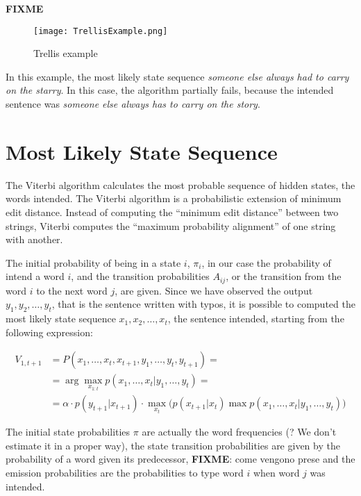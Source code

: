 \textbf{FIXME}
\begin{figure}[H]
	\centering
	\texttt{[image: TrellisExample.png]}
	\caption{Trellis example}
	\label{fig:trellis}
\end{figure}

In this example, the most likely state sequence \textsl{someone else always had to carry on the starry}. In this 
case, the algorithm partially fails, because the intended sentence was \textsl{someone else always has to carry 
	on the story}.


\section{Most Likely State Sequence}

The Viterbi algorithm calculates the most probable sequence of hidden states, the words intended.
The Viterbi algorithm is a probabilistic extension of minimum edit distance. Instead of computing the “minimum 
edit distance” between two strings, Viterbi computes the “maximum probability alignment” of one string with 
another. 

The initial probability of being in a state $i$, $\pi_i$, in our case the probability of intend a word $i$, and the 
transition probabilities $A_{ij}$, or the transition from the word $i$ to the next word $j$, are given. Since we have 
observed the output $y_1, y_2, \dots , y_t$, that is the sentence written with typos, it is possible to computed the most 
likely state sequence $x_1, x_2, \dots , x_t$, the sentence intended, starting from the following expression:

\begin{equation}
\begin{aligned}
V_{1,t+1} &= P(x_1, \dots, x_t, x_{t+1}, y_1, \dots, y_t,  y_{t+1}) = \\
&= \arg\max_{x_{1:t}} p(x_1, \dots, x_t | y_1, \dots, y_t) = \\
& =  \alpha \cdot p(y_{t+1}|x_{t+1})\cdot\max_{x_t} \Big( p(x_{t+1}|x_t) \max p(x_1, \dots, x_{t}|y_1, 
\dots, y_t)\Big)
\end{aligned}
\end{equation}

The initial state probabilities $\pi$ are actually the word frequencies (? We don’t estimate it in a proper way), the state 
transition probabilities are given by the probability of a word given its predecessor, \textbf{FIXME}: {come vengono prese} 
and the emission probabilities are the probabilities to type word $i$ when word $j$ was intended.

